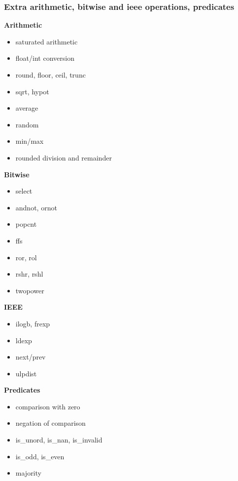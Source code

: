 \begin{frame}
	\frametitle{Extra arithmetic, bitwise and ieee operations, predicates}
	
	\begin{multicols}{3}		
	
		\textbf{Arithmetic}
		\begin{itemize}
			\item saturated arithmetic
			\item float/int conversion
			\item round, floor, ceil, trunc
			\item sqrt, hypot
			\item average
			\item random
			\item min/max
			\item rounded division and remainder
		\end{itemize}

		\textbf{Bitwise}
		\begin{itemize}			
			\item select
			\item andnot, ornot
			\item popcnt
			\item ffs
			\item ror, rol
			\item rshr, rshl
			\item twopower
		\end{itemize}
			\vfill
		\textbf{IEEE}
		\begin{itemize}
			\item ilogb, frexp
			\item ldexp
			\item next/prev
			\item ulpdist
		\end{itemize}
			
		\textbf{Predicates}
		\begin{itemize}
			\item comparison with zero
			\item negation of comparison
			\item is\_unord, is\_nan, is\_invalid
			\item is\_odd, is\_even
			\item majority
		\end{itemize}
		
		\vfill
	
	\end{multicols}
	
\end{frame}

